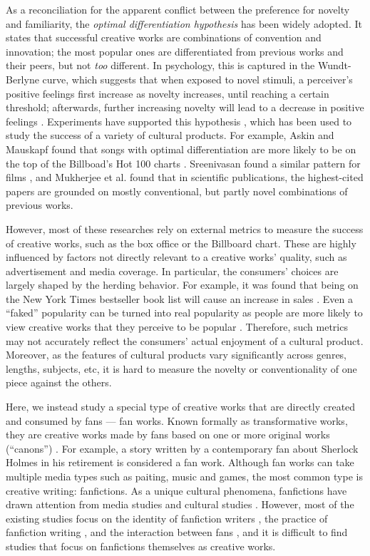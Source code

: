 \documentclass[letterpaper]{article} %
\begin{document}
As a reconciliation for the apparent conflict between the preference for novelty and familiarity, the \emph{optimal differentiation hypothesis} \cite{thompson2017hit} has been widely adopted. It states that successful creative works are combinations of convention and innovation; the most popular ones are differentiated from previous works and their peers, but not \emph{too} different. In psychology, this is captured in the Wundt-Berlyne curve, which suggests that when exposed to novel stimuli, a perceiver's positive feelings first increase as novelty increases, until reaching a certain threshold; afterwards, further increasing novelty will lead to a decrease in positive feelings \cite{berlyne1970novelty}. Experiments have supported this hypothesis \cite{hargreaves1984effects} \cite{sluckin1980liking}, which has been used to study the success of a variety of cultural products. For example, Askin and Mauskapf found that songs with optimal differentiation are more likely to be on the top of the Billboad's Hot 100 charts \cite{askin2017makes}. Sreenivasan found a similar pattern for films \cite{sreenivasan2013quantitative}, and Mukherjee et al. found that in scientific publications, the highest-cited papers are grounded on mostly conventional, but partly novel combinations of previous works. 

However, most of these researches rely on external metrics to measure the success of creative works, such as the box office or  the Billboard chart. These are highly influenced by factors not directly relevant to a creative works' quality, such as advertisement and media coverage. In particular, the consumers' choices are largely shaped by the herding behavior. For example, it was found that being on the New York Times bestseller book list will cause an increase in sales \cite{sorensen2007bestseller}.  Even a ``faked'' popularity can be turned into real popularity as people are more likely to view creative works that they perceive to be popular \cite{salganik2008leading}. Therefore, such metrics may not accurately reflect the consumers' actual enjoyment of a cultural product. Moreover, as the features of cultural products vary significantly across genres, lengths, subjects, etc, it is hard to measure the novelty or conventionality of one piece against the others. 

Here, we instead study a special type of creative works that are directly created and consumed by fans --- fan works. Known formally as transformative works, they are creative works made by fans based on one or more original works (``canons'') \cite{wiki:transf_work}. For example, a story written by a contemporary fan about Sherlock Holmes in his retirement is considered a fan work. Although fan works can take multiple media types such as paiting, music and games, the most common type is creative writing: fanfictions. As a unique cultural phenomena, fanfictions have drawn attention from media studies and cultural studies \cite{thomas2011fanfiction}. However, most of the existing studies focus on the identity of fanfiction writers \cite{black2006language}, the practice of fanfiction writing \cite{LIT:LIT12061}, and the interaction between fans \cite{hills2015expertise}, and it is difficult to find studies that focus on fanfictions themselves as creative works.
\end{document}
